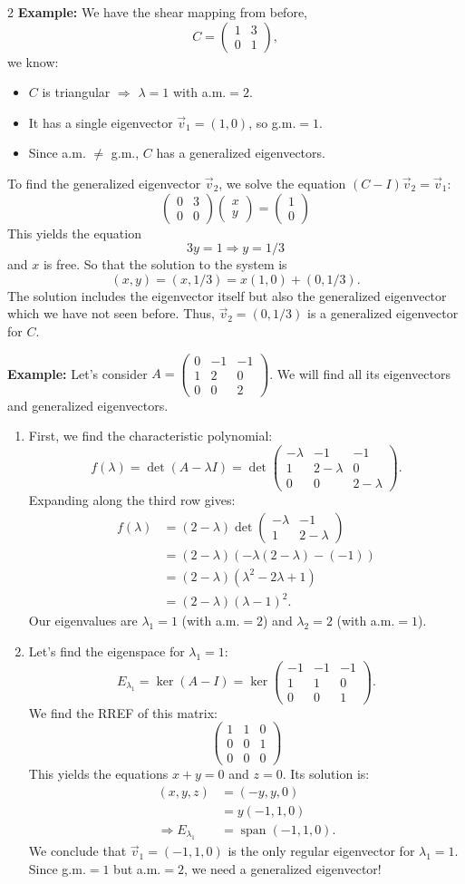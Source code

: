 \documentclass[12pt]{article}
\newcommand{\twobytwo}[4]{\begin{pmatrix} %
    #1 & #2 \\ #3 & #4 \end{pmatrix}}
\newcommand{\threebythree}[9]{\begin{pmatrix} %
  #1 & #2 & #3 \\ #4 & #5 & #6 \\ #7 & #8 & #9 \end{pmatrix}}
\newcommand{\To}{\Rightarrow}
\begin{document}
\begin{multicols}{2}
\textbf{Example:}
We have the shear mapping from before, 
\[C=\twobytwo{1}{3}{0}{1},\]
we know:
\begin{itemize}
  \item \(C\) is triangular \(\To\) \(\lambda=1\) with a.m.\(=2\).
  \item It has a single eigenvector \(\vec{v}_1=(1,0)\), so g.m.\(=1\).
  \item Since a.m. \(\neq\) g.m., \(C\) has a generalized eigenvectors.
\end{itemize}

To find the generalized eigenvector \(\vec{v}_2\), we solve the equation \((C - I)\vec{v}_2 = \vec{v}_1\):
\[\twobytwo{0}{3}{0}{0}\begin{pmatrix}x\\y\end{pmatrix} = \begin{pmatrix}1\\0\end{pmatrix}\]
This yields the equation 
\[
3y=1\To y=1/3
\]
and \(x\) is free. So that the solution to the system is
\[
(x,y)=(x,1/3)=x(1,0)+(0,1/3).
\] 
The solution includes the eigenvector itself but also the generalized eigenvector which we have not seen before.
Thus, \(\vec{v}_2=(0,1/3)\) is a generalized eigenvector for \(C\).

\textbf{Example:}
Let's consider \(A=\threebythree{0}{-1}{-1}{1}{2}{0}{0}{0}{2}\). We will find all its eigenvectors and generalized eigenvectors.
\begin{enumerate}
  \item First, we find the characteristic polynomial:
  \[f(\lambda) = \det(A-\lambda I) = \det\threebythree{-\lambda}{-1}{-1}{1}{2-\lambda}{0}{0}{0}{2-\lambda}.\]
  Expanding along the third row gives:
  \begin{align*}
      f(\lambda) &= (2-\lambda) \det\twobytwo{-\lambda}{-1}{1}{2-\lambda} \\
      &= (2-\lambda)(-\lambda(2-\lambda) - (-1)) \\
      &= (2-\lambda)(\lambda^2 - 2\lambda + 1) \\
      &= (2-\lambda)(\lambda - 1)^2.
  \end{align*}
  Our eigenvalues are \(\lambda_1=1\) (with a.m.\(=2\)) and \(\lambda_2=2\) (with a.m.\(=1\)).
  
  \item Let's find the eigenspace for \(\lambda_1=1\):
  \[E_{\lambda_1}=\ker(A-I)=\ker\threebythree{-1}{-1}{-1}{1}{1}{0}{0}{0}{1}.\]
  We find the RREF of this matrix:
  \[\threebythree{1}{1}{0}{0}{0}{1}{0}{0}{0}\]
  This yields the equations \(x+y=0\) and \(z=0\). Its solution is:
  \begin{align*}
    (x,y,z) &= (-y, y, 0) \\
    &= y(-1, 1, 0) \\
    \To E_{\lambda_1} &= \operatorname{span}(-1, 1, 0).
  \end{align*}
  We conclude that \(\vec{v}_1=(-1,1,0)\) is the only regular eigenvector for \(\lambda_1=1\). Since g.m.\(=1\) but a.m.\(=2\), we need a generalized eigenvector!
  

\end{enumerate}
\end{multicols}
\end{document}
